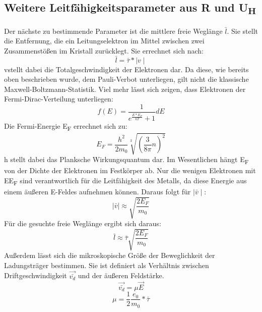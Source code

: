 \documentclass[titlepage=firstcover, captions=tableheading]{scrartcl}
\begin{document}
\subsection{Weitere Leitfähigkeitsparameter aus R und U\textsubscript{H}}
Der nächste zu bestimmende Parameter ist die mittlere freie Weglänge $\bar{l}$. Sie stellt die Entfernung, die ein Leitungselektron im Mittel zwischen zwei Zusammenstößen im Kristall zurücklegt. Sie errechnet sich nach:
\begin{equation}
    \bar{l}=\bar{\tau}*\mid v\mid
\end{equation}
\mid v\mid stellt dabei die Totalgeschwindigkeit der Elektronen dar. Da diese, wie bereits oben beschrieben wurde, dem Pauli-Verbot unterliegen, gilt nicht die klassische Maxwell-Boltzmann-Statistik. Viel mehr lässt sich zeigen, dass Elektronen der Fermi-Dirac-Verteilung unterliegen:
\begin{equation}
    f(E)=\frac{1}{e^\frac{E*E_F}{kT}+1}dE
\end{equation}
Die Fermi-Energie E\textsubscript{F} errechnet sich zu:
\begin{equation}
    E_F=\frac{h^2}{2m_0}\sqrt[3]{(\frac{3}{8\pi}n)^2}
\end{equation}
h stellt dabei das Planksche Wirkungsquantum dar. Im Wesentlichen hängt E\textsubscript{F} von der Dichte der Elektronen im Festkörper ab. Nur die wenigen Elektronen mit E\approx E\textsubscript{F} sind verantwortlich für die Leitfähigkeit des Metalls, da diese Energie aus einem äußeren E-Feldes aufnehmen können. Daraus folgt für $\mid \bar{v} \mid$:
\begin{equation}
    \mid \bar{v} \mid\approx \sqrt{\frac{2E_F}{m_0}}
\end{equation}
Für die gesuchte freie Weglänge ergibt sich daraus:
\begin{equation}
    \bar{l}\approx\bar{\tau}\sqrt{\frac{2E_F}{m_0}}
\end{equation}
Außerdem lässt sich die mikroskopische Größe der Beweglichkeit \mu der Ladungsträger bestimmen. Sie ist definiert als Verhältnis zwischen Driftgeschwindigkeit $\vec{\bar{v_d}}$ und der äußeren Feldstärke.
\begin{equation}
    \vec{\bar{v_d}}=\mu\vec{E}
\end{equation}
\begin{equation}
    \mu=\frac{1}{2}\frac{e_0}{m_0}*\bar{\tau}
\end{equation}
\end{document}
